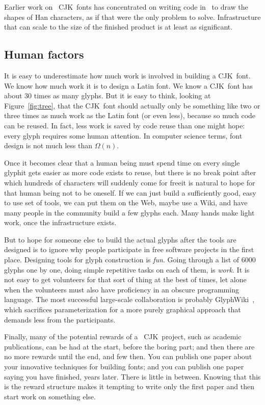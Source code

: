 \documentclass{ltugboat}
\def\CJK{CJK}
\begin{document}
Earlier work on \MF\ \CJK\ fonts has concentrated on writing code in \MF\ to
draw the shapes of Han characters, as if that were the only problem to solve. 
Infrastructure that can scale to the size of the finished product is at
least as significant.

\subsection{Human factors}

It is easy to underestimate how much work is involved in building a \CJK\
font.  We know how much work it is to design a Latin font.  We know a \CJK\
font has about 30 times as many glyphs.  But it is easy to think, looking at
Figure~\ref{fig:tree}, that the \CJK\ font should actually only be something
like two or three times as much work as the Latin font (or even less),
because so much code can be reused.  In fact, less work is saved by code
reuse than one might hope: every glyph requires some human attention.  In
computer science terms, font design is not much less than $\Omega(n)$.

Once it becomes clear that a human being must spend time on every single
glyph\Dash it gets easier as more code exists to reuse, but there is no
break point after which hundreds of characters will suddenly come for
free\Dash it is natural to hope for that human being not to be oneself.  If
we can just build a sufficiently good, easy to use set of tools, we can put
them on the Web, maybe use a Wiki, and have many people in the community
build a few glyphs each.  Many hands make light work, once the
infrastructure exists.

But to hope for someone else to build the actual glyphs after the tools are
designed is to ignore why people participate in free software projects in
the first place.  Designing tools for glyph construction is \emph{fun}. 
Going through a list of 6000 glyphs one by one, doing simple repetitive
tasks on each of them, is \emph{work}.  It is not easy to get volunteers for
that sort of thing at the best of times, let alone when the volunteers must
also have proficiency in an obscure programming language.  The most
successful large-scale collaboration is probably
GlyphWiki~\cite{Kamichi:GlyphWiki}, which sacrifices parameterization for a
more purely graphical approach that demands less from the participants.

Finally, many of the potential rewards of a 
\linebreak%
\MF\ \CJK\ project, such as
academic publications, can be had at the start, before the boring part; and
then there are no more rewards until the end, and few then.  You can publish
one paper about your innovative techniques for building fonts; and you can
publish one paper saying you have finished, years later.  There is little in
between.  Knowing that this is the reward structure makes it tempting to
write only the first paper and then start work on something else.
\end{document}
